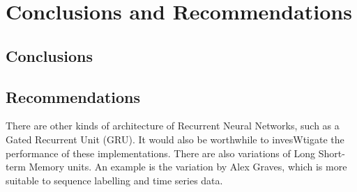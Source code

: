 
\chapter{Conclusions and Recommendations}  %

\section{Conclusions}

\section{Recommendations}
    There are other kinds of architecture of Recurrent Neural Networks, such as a Gated Recurrent Unit (GRU). It would also be worthwhile to invesWtigate the performance of these implementations.
    There are also variations of Long Short-term Memory units. An example is the variation by Alex Graves, which is more suitable to sequence labelling and time series data.